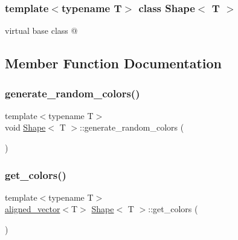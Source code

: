 \subsubsection*{template$<$typename T$>$\newline
class Shape$<$ T $>$}

virtual base class @ 

\subsection{Member Function Documentation}
\mbox{\label{classShape_aabeb601fe95b412987d5b5c276bf8a7a}} 
\subsubsection{\texorpdfstring{generate\+\_\+random\+\_\+colors()}{generate\_random\_colors()}}
{\footnotesize\ttfamily template$<$typename T$>$ \\
void \mbox{\hyperlink{classShape}{Shape}}$<$ T $>$\+::generate\+\_\+random\+\_\+colors (\begin{DoxyParamCaption}{ }\end{DoxyParamCaption})\hspace{0.3cm}{\ttfamily [inline]}}

\mbox{\label{classShape_aabe9bd208b0ece9824cb45deccc11ba7}} 
\subsubsection{\texorpdfstring{get\+\_\+colors()}{get\_colors()}}
{\footnotesize\ttfamily template$<$typename T$>$ \\
\mbox{\hyperlink{type__definitions_8hpp_accb98a876f193a416d9c8a02fe22d526}{aligned\+\_\+vector}}$<$T$>$ \mbox{\hyperlink{classShape}{Shape}}$<$ T $>$\+::get\+\_\+colors (\begin{DoxyParamCaption}{ }\end{DoxyParamCaption})\hspace{0.3cm}{\ttfamily [inline]}}

\mbox{\label{classShape_a58713d8cf7c4175e7c76eae75c94bc13}} 
